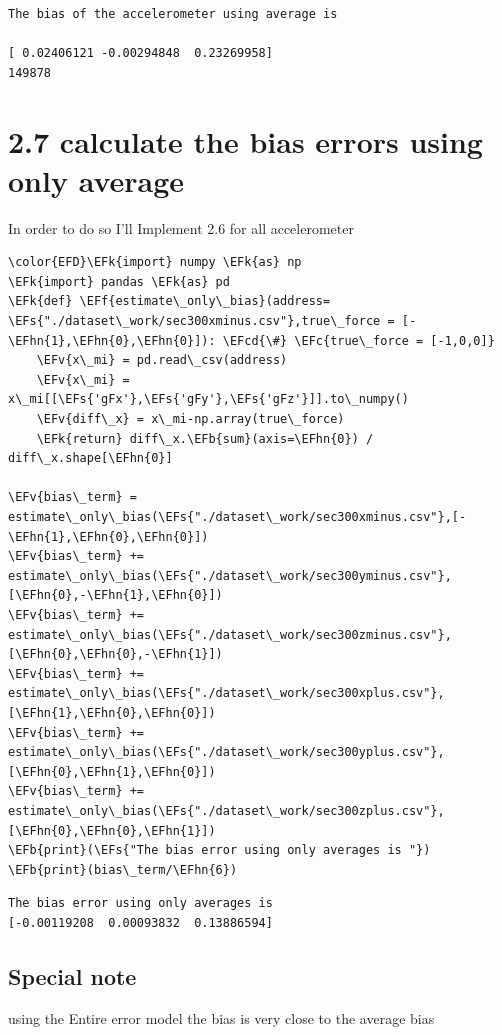 \documentclass[11pt]{article}
\newcommand{\EFc}[1]{\textcolor{EFc}{#1}} %
\newcommand{\EFcd}[1]{\textcolor{EFcd}{#1}} %
\newcommand{\EFs}[1]{\textcolor{EFs}{#1}} %
\newcommand{\EFk}[1]{\textcolor{EFk}{#1}} %
\newcommand{\EFb}[1]{\textcolor{EFb}{#1}} %
\newcommand{\EFf}[1]{\textcolor{EFf}{#1}} %
\newcommand{\EFv}[1]{\textcolor{EFv}{#1}} %
\newcommand{\EFhn}[1]{\textcolor{EFhn}{#1}} %
\begin{document}
\label{}
\begin{verbatim}
The bias of the accelerometer using average is 

[ 0.02406121 -0.00294848  0.23269958]
149878
\end{verbatim}

\newpage
\section{2.7 calculate the bias errors using only average}
\label{sec:orga82b864}
In order to do so I'll Implement 2.6 for all accelerometer 

\begin{Code}
\begin{Verbatim}
\color{EFD}\EFk{import} numpy \EFk{as} np
\EFk{import} pandas \EFk{as} pd
\EFk{def} \EFf{estimate\_only\_bias}(address= \EFs{"./dataset\_work/sec300xminus.csv"},true\_force = [-\EFhn{1},\EFhn{0},\EFhn{0}]): \EFcd{\#} \EFc{true\_force = [-1,0,0]}
    \EFv{x\_mi} = pd.read\_csv(address)
    \EFv{x\_mi} = x\_mi[[\EFs{'gFx'},\EFs{'gFy'},\EFs{'gFz'}]].to\_numpy()
    \EFv{diff\_x} = x\_mi-np.array(true\_force)
    \EFk{return} diff\_x.\EFb{sum}(axis=\EFhn{0}) / diff\_x.shape[\EFhn{0}]

\EFv{bias\_term} = estimate\_only\_bias(\EFs{"./dataset\_work/sec300xminus.csv"},[-\EFhn{1},\EFhn{0},\EFhn{0}])
\EFv{bias\_term} += estimate\_only\_bias(\EFs{"./dataset\_work/sec300yminus.csv"},[\EFhn{0},-\EFhn{1},\EFhn{0}])
\EFv{bias\_term} += estimate\_only\_bias(\EFs{"./dataset\_work/sec300zminus.csv"},[\EFhn{0},\EFhn{0},-\EFhn{1}])
\EFv{bias\_term} += estimate\_only\_bias(\EFs{"./dataset\_work/sec300xplus.csv"},[\EFhn{1},\EFhn{0},\EFhn{0}])
\EFv{bias\_term} += estimate\_only\_bias(\EFs{"./dataset\_work/sec300yplus.csv"},[\EFhn{0},\EFhn{1},\EFhn{0}])
\EFv{bias\_term} += estimate\_only\_bias(\EFs{"./dataset\_work/sec300zplus.csv"},[\EFhn{0},\EFhn{0},\EFhn{1}])
\EFb{print}(\EFs{"The bias error using only averages is "})
\EFb{print}(bias\_term/\EFhn{6})
\end{Verbatim}
\end{Code}

\label{}
\begin{verbatim}
The bias error using only averages is 
[-0.00119208  0.00093832  0.13886594]
\end{verbatim}
\subsection{Special note}
\label{sec:org0d8f478}
using the Entire error model the bias is very close to the average bias 
\end{document}
